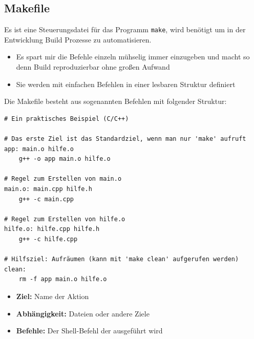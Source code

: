 \subsection{Makefile}

Es ist eine Steuerungsdatei für das Programm \texttt{make}, wird benötigt um in der Entwicklung Build Prozesse zu automatisieren.

\begin{itemize}
  \item Es spart mir die Befehle einzeln mühselig immer einzugeben und macht so denn Build reproduzierbar ohne großen Aufwand
  \item Sie werden mit einfachen Befehlen in einer lesbaren Struktur definiert
\end{itemize}

Die Makefile besteht aus sogenannten Befehlen mit folgender Struktur:

\begin{verbatim}
# Ein praktisches Beispiel (C/C++)

# Das erste Ziel ist das Standardziel, wenn man nur 'make' aufruft
app: main.o hilfe.o
	g++ -o app main.o hilfe.o

# Regel zum Erstellen von main.o
main.o: main.cpp hilfe.h
	g++ -c main.cpp

# Regel zum Erstellen von hilfe.o
hilfe.o: hilfe.cpp hilfe.h
	g++ -c hilfe.cpp

# Hilfsziel: Aufräumen (kann mit 'make clean' aufgerufen werden)
clean:
	rm -f app main.o hilfe.o
\end{verbatim}

\begin{itemize}
  \item \textbf{Ziel:} Name der Aktion
  \item \textbf{Abhängigkeit:} Dateien oder andere Ziele
  \item \textbf{Befehle:} Der Shell-Befehl der ausgeführt wird
\end{itemize}
